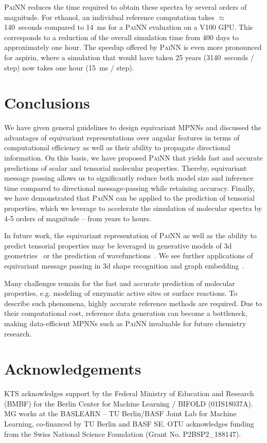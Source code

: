 \documentclass[reprint,
amsmath,amssymb,
 aip,jcp
]{revtex4-2}
\newcommand{\painn}{\textsc{PaiNN}}
\begin{document}
\painn{} reduces the time required to obtain these spectra by several orders of magnitude.
For ethanol, an individual reference computation takes $\approx$ 140~seconds compared to 14~ms for a \painn{} evaluation on a V100 GPU.
This corresponds to a reduction of the overall simulation time from 400 days to approximately one hour.
The speedup offered by \painn{} is even more pronounced for aspirin, where a simulation that would have taken 25 years (3140~seconds / step) now takes one hour (15~ms / step).


\section{Conclusions}
We have given general guidelines to design equivariant MPNNs and discussed the advantages of equivariant representations over angular features in terms of computational efficiency as well as their ability to propagate directional information.
On this basis, we have proposed \painn{} that yields fast and accurate predictions of scalar and tensorial molecular properties.
Thereby, equivariant message passing allows us to significantly reduce both model size and inference time compared to directional message-passing while retaining accuracy.
Finally, we have demonstrated that \painn{} can be applied to the prediction of tensorial properties, which we leverage to accelerate the simulation of molecular spectra by 4-5 orders of magnitude -- from years to hours.

In future work, the equivariant representation of \painn{} as well as the ability to predict tensorial properties may be leveraged in generative models of 3d geometries~\cite{gebauer2019symmetry,kohler2019equivariant,simm2020symmetry} or the prediction of wavefunctions~\cite{hegde2017machine,schutt2019unifying,hermann2020deep}.
We see further applications of equivariant message passing in 3d shape recognition and graph embedding~\cite{goyal2018graph}.

Many challenges remain for the fast and accurate prediction of molecular properties, e.g.  modeling of enzymatic active sites or surface reactions.
To describe such phenomena, highly accurate reference methods are required. Due to their computational cost, reference data generation can become a bottleneck, making data-efficient MPNNs such as \painn{} invaluable for future chemistry research.

\section*{Acknowledgements}
KTS acknowledges support by the Federal Ministry of Education and Research (BMBF) for the Berlin Center for Machine Learning / BIFOLD (01IS18037A).
MG works at the BASLEARN – TU Berlin/BASF Joint Lab for Machine Learning, co-financed by TU Berlin and BASF SE.
OTU acknowledges funding from the Swiss National Science Foundation (Grant No. P2BSP2\_188147).
\end{document}
